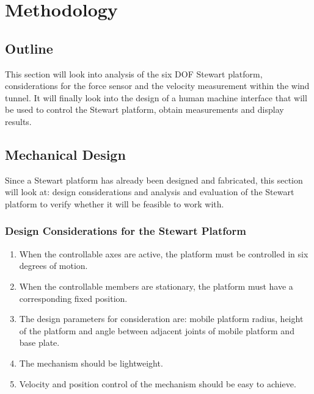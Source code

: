 \chapter{Methodology}
\section{Outline}
This section will look into analysis of the six DOF Stewart platform, considerations for the force sensor and the velocity measurement within the wind tunnel. It will finally look into the design of a human machine interface that will be used to control the Stewart platform, obtain measurements and display results.

\section{Mechanical Design}
Since a Stewart platform has already been designed and fabricated, this section will look at: design considerations and analysis and evaluation of the Stewart platform to verify whether it will be feasible to work with.
\subsection{Design Considerations for the Stewart Platform}
\begin{enumerate}
\item When the controllable axes are active, the platform must be controlled in six degrees of motion.
\item When the controllable members are stationary, the
platform must have a corresponding fixed position.
\item The design parameters for consideration are: mobile platform radius, height of the platform and angle between adjacent joints of mobile platform and base plate.
\item The mechanism should be lightweight.
\item Velocity and position control of the mechanism should be easy to achieve.
\end{enumerate}


